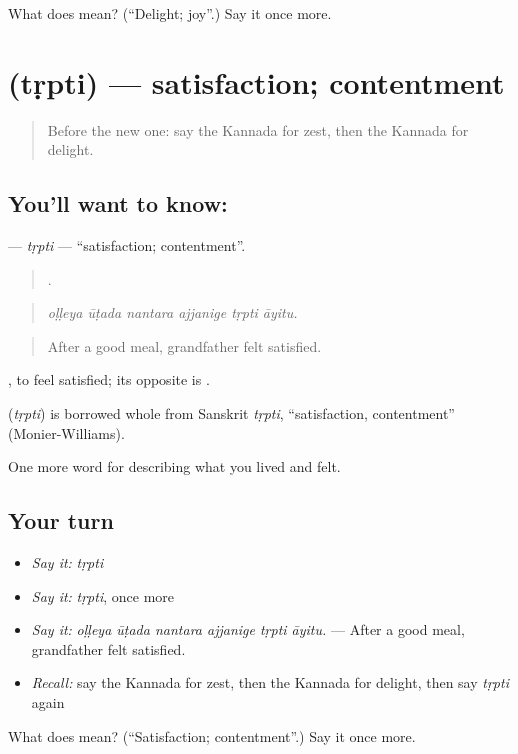 \begin{tcolorbox}[breakable,colback=teal!4,colframe=teal!35!black,title={Before you move on}]
What does  mean? (\textquotedblleft{}Delight; joy\textquotedblright{}.) Say it once more.
\end{tcolorbox}
\section[\texorpdfstring{\kn{ತೃಪ್ತಿ} (tṛpti)}{ತೃಪ್ತಿ (tṛpti)}]{ (tṛpti) — satisfaction; contentment}

\label{lesson:KA-C492-trpti}



\begin{quote}
Before the new one: say the Kannada for zest, then the Kannada for delight.
\end{quote}

\subsection*{You'll want to know: }
\textbf{} — \emph{tṛpti} — \textquotedblleft{}satisfaction; contentment\textquotedblright{}.

\begin{quote}
     .
\end{quote}

\begin{quote}
\emph{oḷḷeya ūṭada nantara ajjanige tṛpti āyitu.}
\end{quote}

\begin{quote}
After a good meal, grandfather felt satisfied.
\end{quote}

 , to feel satisfied; its opposite is .

\begin{cousinweb}
\textbf{} (\emph{tṛpti}) is borrowed whole from Sanskrit \emph{tṛpti}, \textquotedblleft{}satisfaction, contentment\textquotedblright{} (Monier-Williams).
\end{cousinweb}

\begin{grammarlens}[title={What you've built}]
One more word for describing what you lived and felt.
\end{grammarlens}

\subsection*{Your turn}
\begin{itemize}
\raggedright
  \item \emph{Say it:} \emph{tṛpti}
  \item \emph{Say it:} \emph{tṛpti}, once more
  \item \emph{Say it:} \emph{oḷḷeya ūṭada nantara ajjanige tṛpti āyitu.} — After a good meal, grandfather felt satisfied.
  \item \emph{Recall:} say the Kannada for zest, then the Kannada for delight, then say \emph{tṛpti} again
\end{itemize}

\begin{tcolorbox}[breakable,colback=teal!4,colframe=teal!35!black,title={Before you move on}]
What does  mean? (\textquotedblleft{}Satisfaction; contentment\textquotedblright{}.) Say it once more.
\end{tcolorbox}
